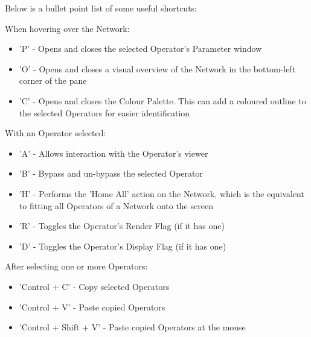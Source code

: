 \begin{fullwidth}

Below is a bullet point list of some useful shortcuts:

\vspace{3mm}

\noindent When hovering over the Network:
\begin{itemize}
\item 'P' - Opens and closes the selected Operator's Parameter window
\item 'O' - Opens and closes a visual overview of the Network in the bottom-left corner of the pane
\item 'C' - Opens and closes the Colour Palette. This can add a coloured outline to the selected Operators for easier identification
\end{itemize}

\vspace{3mm}

\noindent With an Operator selected:
\begin{itemize}
\item 'A' - Allows interaction with the Operator's viewer
\item 'B' - Bypass and un-bypass the selected Operator
\item 'H' - Performs the 'Home All' action on the Network, which is the equivalent to fitting all Operators of a Network onto the screen 
\item 'R' - Toggles the Operator's Render Flag (if it has one)
\item 'D' - Toggles the Operator's Display Flag (if it has one)
\end{itemize}

\vspace{3mm}

\noindent After selecting one or more Operators:
\begin{itemize}
\item 'Control + C' - Copy selected Operators
\item 'Control + V' - Paste copied Operators
\item 'Control + Shift + V' - Paste copied Operators at the mouse
\end{itemize}

\end{fullwidth}
